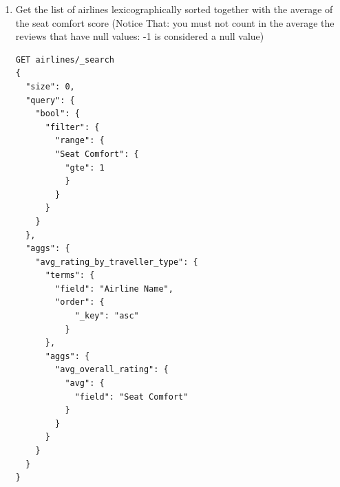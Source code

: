 \documentclass{Configuration_Files/PoliMi3i_thesis}
\begin{document}
\begin{enumerate}
\begin{figure}[H]
\end{figure}

\newpage

    \item Get the list of airlines lexicographically sorted together with the average of the seat comfort score (Notice That: you must not count in the average the reviews that have null values: -1 is considered a null value)
    \begin{verbatim}
GET airlines/_search
{
  "size": 0,
  "query": {
    "bool": {
      "filter": {
        "range": {
        "Seat Comfort": {
          "gte": 1
          }
        }
      }
    }
  }, 
  "aggs": {
    "avg_rating_by_traveller_type": {
      "terms": {
        "field": "Airline Name",
        "order": {
            "_key": "asc"
          }
      },
      "aggs": {
        "avg_overall_rating": {
          "avg": {
            "field": "Seat Comfort"
          }
        }
      }
    }
  }
}
\end{verbatim}
\begin{figure}[H]
    \centering
    \quad
    \subfloat{
}
\end{figure}
\end{enumerate}
\end{document}
